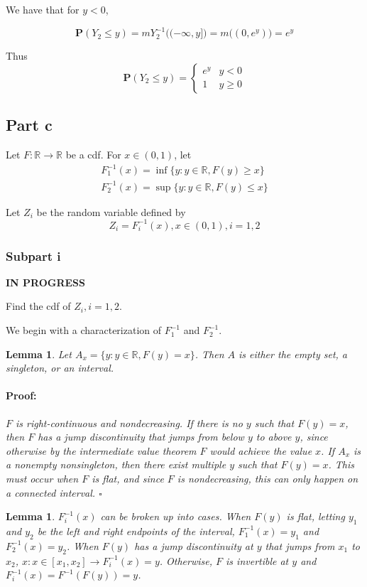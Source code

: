 \documentclass{article}
\newenvironment{proof}{\paragraph{Proof:}}{\hfill$\square$}
\newtheorem{lemma}[theorem]{Lemma}
\newcommand{\R}{\mathbb{R}}
\newcommand{\prob}{\boldsymbol{P}}
\begin{document}
We have that for $y < 0$,

\[
\prob(Y_2 \leq y) = mY_2^{-1}\bigl( (-\infty, y] \bigl) = m\bigl( (0, e^y) \bigl) = e^y
\]

Thus
\[
\prob(Y_2 \leq y) =
\begin{cases}
e^y & y < 0 \\
1 & y \geq 0
\end{cases}
\]

\subsection*{Part c}

Let $F: \R \rightarrow \R$ be a cdf. For $x \in (0, 1)$, let
\begin{gather*}
F_1^{-1}(x) = \inf\{ y: y \in \R, F(y) \geq x\} \\
F_2^{-1}(x) = \sup\{ y: y \in \R, F(y) \leq x\}
\end{gather*}

Let $Z_i$ be the random variable defined by
\[
Z_i = F_i^{-1}(x), x \in (0, 1), i = 1, 2
\]
\subsubsection*{Subpart i}

\textbf{IN PROGRESS}

Find the cdf of $Z_i, i = 1, 2$.

We begin with a characterization of $F_1^{-1}$ and $F_2^{-1}$.

\begin{lemma}
Let $A_x = \{ y: y \in \R, F(y) = x \}$. Then $A$ is either the empty set, a singleton, or an interval.
\begin{proof}
$F$ is right-continuous and nondecreasing. If there is no $y$ such that $F(y) = x$, then $F$ has a jump discontinuity that jumps from below $y$ to above $y$, since otherwise by the intermediate value theorem $F$ would achieve the value $x$. If $A_x$ is a nonempty nonsingleton, then there exist multiple $y$ such that $F(y) = x$. This must occur when $F$ is flat, and since $F$ is nondecreasing, this can only happen on a connected interval.
\end{proof}
\end{lemma}

\begin{lemma}
$F_i^{-1}(x)$ can be broken up into cases. When $F(y)$ is flat, letting $y_1$ and $y_2$ be the left and right endpoints of the interval, $F_1^{-1}(x) = y_1$ and $F_2^{-1}(x) = y_2$. When $F(y)$ has a jump discontinuity at $y$ that jumps from $x_1$ to $x_2$, $x:x\in[x_1, x_2] \rightarrow F_i^{-1}(x) = y$. Otherwise, $F$ is invertible at $y$ and $F_i^{-1}(x) = F^{-1}(F(y)) = y$.
\end{lemma}
\end{document}
